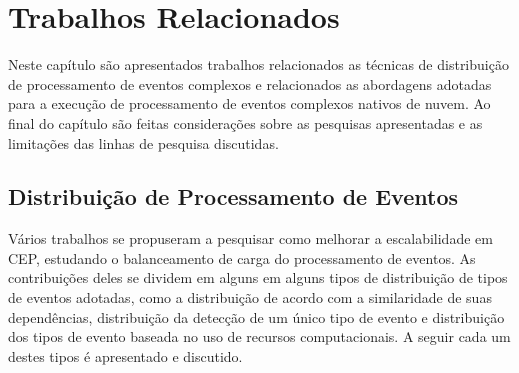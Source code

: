 \chapter{Trabalhos Relacionados}
\label{cap:trabalhos}



Neste capítulo são apresentados trabalhos relacionados as técnicas de distribuição de processamento de eventos complexos e relacionados as abordagens adotadas para a execução de processamento de eventos complexos nativos de nuvem. Ao final do capítulo são feitas considerações sobre as pesquisas apresentadas e as limitações das linhas de pesquisa discutidas.

\section{Distribuição de Processamento de Eventos}

Vários trabalhos se propuseram a pesquisar como melhorar a escalabilidade em CEP, estudando o balanceamento de carga do processamento de eventos. As contribuições deles se dividem em alguns em alguns tipos de distribuição de tipos de eventos adotadas, como a distribuição de acordo com a similaridade de suas dependências, distribuição da detecção de um único tipo de evento e distribuição dos tipos de evento baseada no uso de recursos computacionais. A seguir cada um destes tipos é apresentado e discutido.





